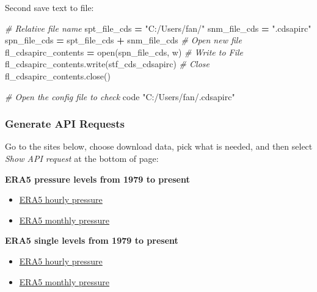 \documentclass[
]{book}
\newenvironment{Shaded}{\begin{snugshade}}{\end{snugshade}}
\newcommand{\BuiltInTok}[1]{#1}
\newcommand{\CommentTok}[1]{\textcolor[rgb]{0.56,0.35,0.01}{\textit{#1}}}
\newcommand{\ExtensionTok}[1]{#1}
\newcommand{\NormalTok}[1]{#1}
\newcommand{\OperatorTok}[1]{\textcolor[rgb]{0.81,0.36,0.00}{\textbf{#1}}}
\newcommand{\StringTok}[1]{\textcolor[rgb]{0.31,0.60,0.02}{#1}}
\providecommand{\tightlist}{%
  \setlength{\itemsep}{0pt}\setlength{\parskip}{0pt}}
\begin{document}
Second save text to file:

\begin{Shaded}
\begin{Highlighting}[]
\CommentTok{\# Relative file name}
\NormalTok{spt\_file\_cds }\OperatorTok{=} \StringTok{"C:/Users/fan/"}
\NormalTok{snm\_file\_cds }\OperatorTok{=} \StringTok{".cdsapirc"}
\NormalTok{spn\_file\_cds }\OperatorTok{=}\NormalTok{ spt\_file\_cds }\OperatorTok{+}\NormalTok{ snm\_file\_cds}
\CommentTok{\# Open new file}
\NormalTok{fl\_cdsapirc\_contents }\OperatorTok{=} \BuiltInTok{open}\NormalTok{(spn\_file\_cds, }\StringTok{\textquotesingle{}w\textquotesingle{}}\NormalTok{)}
\CommentTok{\# Write to File}
\NormalTok{fl\_cdsapirc\_contents.write(stf\_cds\_cdsapirc)}
\CommentTok{\# Close}
\NormalTok{fl\_cdsapirc\_contents.close()}
\end{Highlighting}
\end{Shaded}

\begin{Shaded}
\begin{Highlighting}[]
\CommentTok{\# Open the config file to check}
\ExtensionTok{code} \StringTok{"C:/Users/fan/.cdsapirc"}
\end{Highlighting}
\end{Shaded}

\hypertarget{generate-api-requests}{%
\subsubsection{Generate API Requests}\label{generate-api-requests}}

Go to the sites below, choose download data, pick what is needed, and then select \emph{Show API request} at the bottom of page:

\textbf{ERA5 pressure levels from 1979 to present}

\begin{itemize}
\tightlist
\item
  \href{https://cds.climate.copernicus.eu/cdsapp\#!/dataset/reanalysis-era5-pressure-levels}{ERA5 hourly pressure}
\item
  \href{https://cds.climate.copernicus.eu/cdsapp\#!/dataset/reanalysis-era5-pressure-levels-monthly-means}{ERA5 monthly pressure}
\end{itemize}

\textbf{ERA5 single levels from 1979 to present}

\begin{itemize}
\tightlist
\item
  \href{https://cds.climate.copernicus.eu/cdsapp\#!/dataset/reanalysis-era5-single-levels}{ERA5 hourly pressure}
\item
  \href{https://cds.climate.copernicus.eu/cdsapp\#!/dataset/reanalysis-era5-single-levels-monthly-means}{ERA5 monthly pressure}
\end{itemize}
\end{document}
